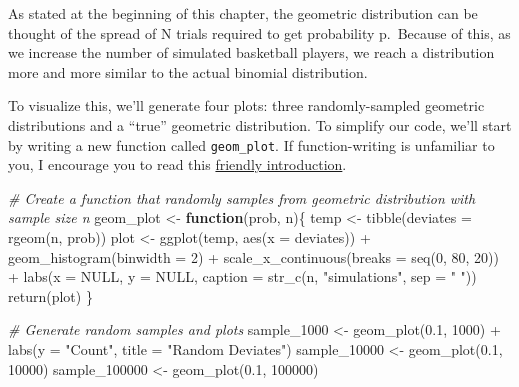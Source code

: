 \documentclass[
]{article}
\newenvironment{Shaded}{\begin{snugshade}}{\end{snugshade}}
\newcommand{\AttributeTok}[1]{\textcolor[rgb]{0.77,0.63,0.00}{#1}}
\newcommand{\CommentTok}[1]{\textcolor[rgb]{0.56,0.35,0.01}{\textit{#1}}}
\newcommand{\ConstantTok}[1]{\textcolor[rgb]{0.00,0.00,0.00}{#1}}
\newcommand{\ControlFlowTok}[1]{\textcolor[rgb]{0.13,0.29,0.53}{\textbf{#1}}}
\newcommand{\DecValTok}[1]{\textcolor[rgb]{0.00,0.00,0.81}{#1}}
\newcommand{\FloatTok}[1]{\textcolor[rgb]{0.00,0.00,0.81}{#1}}
\newcommand{\FunctionTok}[1]{\textcolor[rgb]{0.00,0.00,0.00}{#1}}
\newcommand{\NormalTok}[1]{#1}
\newcommand{\OtherTok}[1]{\textcolor[rgb]{0.56,0.35,0.01}{#1}}
\newcommand{\SpecialCharTok}[1]{\textcolor[rgb]{0.00,0.00,0.00}{#1}}
\newcommand{\StringTok}[1]{\textcolor[rgb]{0.31,0.60,0.02}{#1}}
\begin{document}
As stated at the beginning of this chapter, the geometric distribution can be thought of the spread of N trials required to get probability p.~Because of this, as we increase the number of simulated basketball players, we reach a distribution more and more similar to the actual binomial distribution.

To visualize this, we'll generate four plots: three randomly-sampled geometric distributions and a ``true'' geometric distribution. To simplify our code, we'll start by writing a new function called \texttt{geom\_plot}. If function-writing is unfamiliar to you, I encourage you to read this \href{https://r4ds.had.co.nz/functions.html}{friendly introduction}.

\begin{Shaded}
\begin{Highlighting}[]
\CommentTok{\# Create a function that randomly samples from geometric distribution with sample size n}
\NormalTok{geom\_plot }\OtherTok{\textless{}{-}} \ControlFlowTok{function}\NormalTok{(prob, n)\{}
\NormalTok{  temp }\OtherTok{\textless{}{-}} \FunctionTok{tibble}\NormalTok{(}\AttributeTok{deviates =} \FunctionTok{rgeom}\NormalTok{(n, prob))}
\NormalTok{  plot }\OtherTok{\textless{}{-}} \FunctionTok{ggplot}\NormalTok{(temp, }\FunctionTok{aes}\NormalTok{(}\AttributeTok{x =}\NormalTok{ deviates)) }\SpecialCharTok{+} 
    \FunctionTok{geom\_histogram}\NormalTok{(}\AttributeTok{binwidth =} \DecValTok{2}\NormalTok{) }\SpecialCharTok{+}
    \FunctionTok{scale\_x\_continuous}\NormalTok{(}\AttributeTok{breaks =} \FunctionTok{seq}\NormalTok{(}\DecValTok{0}\NormalTok{, }\DecValTok{80}\NormalTok{, }\DecValTok{20}\NormalTok{)) }\SpecialCharTok{+}
    \FunctionTok{labs}\NormalTok{(}\AttributeTok{x =} \ConstantTok{NULL}\NormalTok{, }\AttributeTok{y =} \ConstantTok{NULL}\NormalTok{, }\AttributeTok{caption =} \FunctionTok{str\_c}\NormalTok{(n, }\StringTok{"simulations"}\NormalTok{, }\AttributeTok{sep =} \StringTok{" "}\NormalTok{))}
  \FunctionTok{return}\NormalTok{(plot)}
\NormalTok{\}}
 
\CommentTok{\# Generate random samples and plots}
\NormalTok{sample\_1000 }\OtherTok{\textless{}{-}} \FunctionTok{geom\_plot}\NormalTok{(}\FloatTok{0.1}\NormalTok{, }\DecValTok{1000}\NormalTok{) }\SpecialCharTok{+}
  \FunctionTok{labs}\NormalTok{(}\AttributeTok{y =} \StringTok{"Count"}\NormalTok{,}
       \AttributeTok{title =} \StringTok{"Random Deviates"}\NormalTok{)}
\NormalTok{sample\_10000 }\OtherTok{\textless{}{-}} \FunctionTok{geom\_plot}\NormalTok{(}\FloatTok{0.1}\NormalTok{, }\DecValTok{10000}\NormalTok{)}
\NormalTok{sample\_100000 }\OtherTok{\textless{}{-}} \FunctionTok{geom\_plot}\NormalTok{(}\FloatTok{0.1}\NormalTok{, }\DecValTok{100000}\NormalTok{)}



\end{Highlighting}
\end{Shaded}
\end{document}
